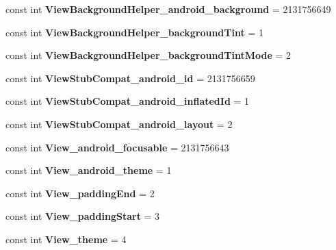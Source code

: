 \begin{DoxyCompactItemize}
const int {\bfseries View\+Background\+Helper\+\_\+android\+\_\+background} = 2131756649
\item 
\mbox{\label{classst_delivery_1_1_resource_1_1_styleable_a0575a4dd5de327e5ae24eb058fe4c283}} 
const int {\bfseries View\+Background\+Helper\+\_\+background\+Tint} = 1
\item 
\mbox{\label{classst_delivery_1_1_resource_1_1_styleable_aaec8ab2f84f93b0853b2d1b5f301dcdf}} 
const int {\bfseries View\+Background\+Helper\+\_\+background\+Tint\+Mode} = 2
\item 
\mbox{\label{classst_delivery_1_1_resource_1_1_styleable_ab3fb3cacace7803bbf4ab85fafd4a52a}} 
const int {\bfseries View\+Stub\+Compat\+\_\+android\+\_\+id} = 2131756659
\item 
\mbox{\label{classst_delivery_1_1_resource_1_1_styleable_a2d6546991fc4443f3b2d41336379c884}} 
const int {\bfseries View\+Stub\+Compat\+\_\+android\+\_\+inflated\+Id} = 1
\item 
\mbox{\label{classst_delivery_1_1_resource_1_1_styleable_ac58d2e2bd58179ca295b02fb209bfdcc}} 
const int {\bfseries View\+Stub\+Compat\+\_\+android\+\_\+layout} = 2
\item 
\mbox{\label{classst_delivery_1_1_resource_1_1_styleable_ae33eb90fdccb8a8d7a2b7a4b25f656c3}} 
const int {\bfseries View\+\_\+android\+\_\+focusable} = 2131756643
\item 
\mbox{\label{classst_delivery_1_1_resource_1_1_styleable_a46ee3be831473c5ab1541c73fa5e9dd0}} 
const int {\bfseries View\+\_\+android\+\_\+theme} = 1
\item 
\mbox{\label{classst_delivery_1_1_resource_1_1_styleable_aa2522ab1b26b34d9662cb7a067a7ff12}} 
const int {\bfseries View\+\_\+padding\+End} = 2
\item 
\mbox{\label{classst_delivery_1_1_resource_1_1_styleable_a644b31f55580c0a9c09c81d12c249440}} 
const int {\bfseries View\+\_\+padding\+Start} = 3
\item 
\mbox{\label{classst_delivery_1_1_resource_1_1_styleable_aac07c573a365608dc2cfc1c8f747aeba}} 
const int {\bfseries View\+\_\+theme} = 4
\end{DoxyCompactItemize}
